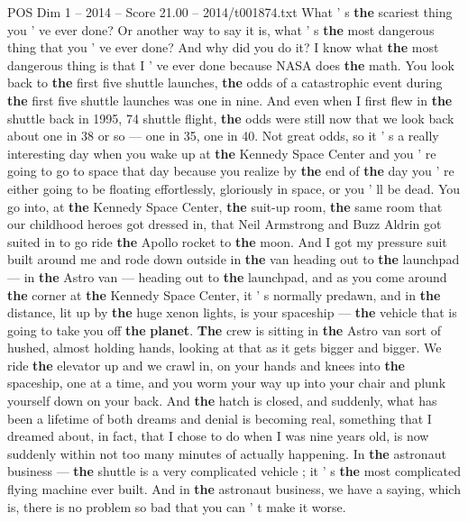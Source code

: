 \begin{textsample}{POS Dim 1 – 2014 – Score 21.00 – 2014/t001874.txt}  \label{ex:f1_pos_046}
What ' s \textbf{the} scariest thing you ' ve ever done?
Or another way to say it is, what ' s \textbf{the} most dangerous thing that you ' ve ever done?
And why did you do it?
I know what \textbf{the} most dangerous thing is that I ' ve ever done because NASA does \textbf{the} math.
You look back to \textbf{the} first five shuttle launches, \textbf{the} odds of a catastrophic event during \textbf{the} first five shuttle launches was one in nine.
And even when I first flew in \textbf{the} shuttle back in 1995, 74 shuttle flight, \textbf{the} odds were still now that we look back about one in 38 or so — one in 35, one in 40.
Not great odds, so it ' s a really interesting day when you wake up at \textbf{the} Kennedy Space Center and you ' re going to go to space that day because you realize by \textbf{the} end of \textbf{the} day you ' re either going to be floating effortlessly, gloriously in space, or you ' ll be dead.
You go into, at \textbf{the} Kennedy Space Center, \textbf{the} suit-up room, \textbf{the} same room that our childhood heroes got dressed in, that Neil Armstrong and Buzz Aldrin got suited in to go ride \textbf{the} Apollo rocket to \textbf{the} moon.
And I got my pressure suit built around me and rode down outside in \textbf{the} van heading out to \textbf{the} launchpad — in \textbf{the} Astro van — heading out to \textbf{the} launchpad, and as you come around \textbf{the} corner at \textbf{the} Kennedy Space Center, it ' s normally predawn, and in \textbf{the} distance, lit up by \textbf{the} huge xenon lights, is your spaceship — \textbf{the} vehicle that is going to take you off \textbf{the} \textbf{planet}. \textbf{The} crew is sitting in \textbf{the} Astro van sort of hushed, almost holding hands, looking at that as it gets bigger and bigger.
We ride \textbf{the} elevator up and we crawl in, on your hands and knees into \textbf{the} spaceship, one at a time, and you worm your way up into your chair and plunk yourself down on your back.
And \textbf{the} hatch is closed, and suddenly, what has been a lifetime of both dreams and denial is becoming real, something that I dreamed about, in fact, that I chose to do when I was nine years old, is now suddenly within not too many minutes of actually happening.
In \textbf{the} astronaut business — \textbf{the} shuttle is a very complicated vehicle ; it ' s \textbf{the} most complicated flying machine ever built.
And in \textbf{the} astronaut business, we have a saying, which is, there is no problem so bad that you can ' t make it worse.

\end{textsample}
